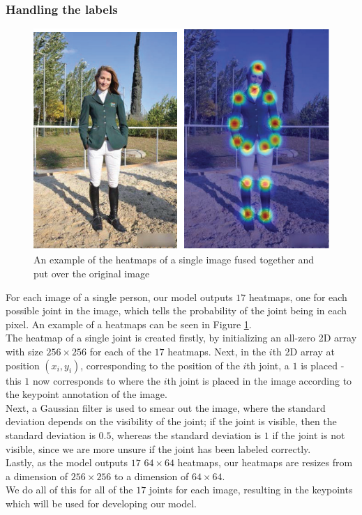 \documentclass[main.tex]{subfiles}
\begin{document}
\subsubsection{Handling the labels}
\begin{figure}[H]
    \centering
    \includegraphics[height = 4 cm]{../entities/heatmaps_ex.PNG}
    \caption{An example of the heatmaps of a single image fused together and put over the original image \cite{survey_1}}
    \label{fig:heatmaps_ex}
\end{figure}
For each image of a single person, our model outputs $17$ heatmaps, one for each possible joint in the image, which tells the probability of the joint being in each pixel. An example of a heatmaps can be seen in Figure \ref{fig:heatmaps_ex}. \\
The heatmap of a single joint is created firstly, by initializing an all-zero 2D array with size $256 \times 256$ for each of the $17$ heatmaps. Next, in the $i$th 2D array at position $(x_i, y_i)$, corresponding to the position of the $i$th joint, a $1$ is placed - this $1$ now corresponds to where the $i$th joint is placed in the image according to the keypoint annotation of the image. \\
Next, a Gaussian filter is used to smear out the image, where the standard deviation depends on the visibility of the joint; if the joint is visible, then the standard deviation is $0.5$, whereas the standard deviation is $1$ if the joint is not visible, since we are more unsure if the joint has been labeled correctly.\\
Lastly, as the model outputs $17$ $64 \times 64$ heatmaps, our heatmaps are resizes from a dimension of $256 \times 256$ to a dimension of $64 \times 64$. \\
We do all of this for all of the $17$ joints for each image, resulting in the keypoints which will be used for developing our model.
\end{document}
